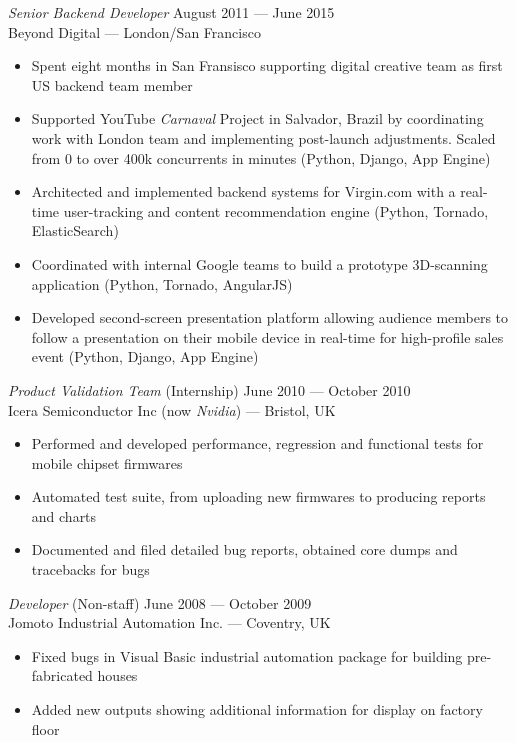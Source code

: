 \documentclass[margin, 10pt]{res}
\begin{document}
\begin{resume}
{\sl Senior Backend Developer} \hfill August 2011 --- June 2015 \\
Beyond Digital --- London/San Francisco \\

\begin{itemize} \itemsep -2pt %
\item Spent eight months in San Fransisco supporting digital creative team as first US backend team member
\item Supported YouTube \textit{Carnaval} Project in Salvador, Brazil by coordinating work with London team and implementing post-launch adjustments. Scaled from 0 to over 400k concurrents in minutes (Python, Django, App Engine)
\item Architected and implemented backend systems for Virgin.com with a real-time user-tracking and content recommendation engine (Python, Tornado, ElasticSearch)
\item Coordinated with internal Google teams to build a prototype 3D-scanning application (Python, Tornado, AngularJS)
\item Developed second-screen presentation platform allowing audience members to follow a presentation on their mobile device in real-time for high-profile sales event (Python, Django, App Engine)
\end{itemize}

{\sl Product Validation Team} \hfill (Internship) June 2010 --- October 2010 \\
Icera Semiconductor Inc (now \textit{Nvidia}) --- Bristol, UK \\
\begin{itemize}
\item Performed and developed performance, regression and functional tests for mobile chipset firmwares
\item Automated test suite, from uploading new firmwares to producing reports and charts
\item Documented and filed detailed bug reports, obtained core dumps and tracebacks for bugs
\end{itemize}

{\sl Developer} \hfill (Non-staff) June 2008 --- October 2009 \\
Jomoto Industrial Automation Inc. --- Coventry, UK \\
\begin{itemize}
\item Fixed bugs in Visual Basic industrial automation package for building pre-fabricated houses
\item Added new outputs showing additional information for display on factory floor
\end{itemize}


\end{resume}
\end{document}

